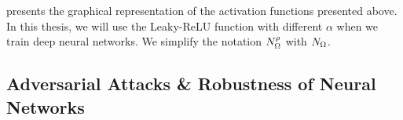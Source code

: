 \noindent
{} presents the graphical representation of the activation functions presented above.
In this thesis, we will use the Leaky-ReLU function with different $\alpha$ when we train deep neural networks.
We simplify the notation $N^\rho_\Omega$ with $N_\Omega$.




%
%
%


%
%



\subsection{Adversarial Attacks \& Robustness of Neural Networks}
\label{subsection:ch2-adversarial_attacks_robustness_of_neural_networks}


